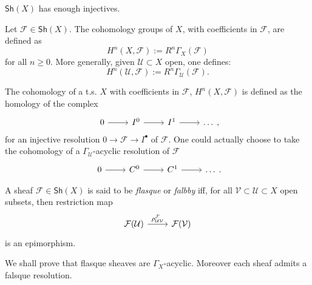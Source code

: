 \documentclass[../Main]{subfiles}
\begin{document}
\begin{prop}[]
	$\mathsf{Sh}\left(X\right)$ has enough injectives.
\end{prop}

\begin{defn}[Cohomology]
	Let $\mathcal{F} \in \mathsf{Sh}\left(X\right)$.
	The cohomology groups of $X$, with coefficients in $\mathcal{F}$,
	are defined as
	\begin{equation}
	H^{n} \left( X, \mathcal{F} \right) := R^{n} \Gamma_X \left( \mathcal{F} \right)
	\end{equation} 
	for all $n \geq 0$.
	More generally, given $\mathcal{U} \subset X$ open, one defines:
	\begin{equation}
	H^{n} \left( \mathcal{U}, \mathcal{F} \right) := R^{n} \Gamma_{\mathcal{U}} \left( \mathcal{F} \right)
	.\end{equation} 
\end{defn}

\begin{rem}[]
	The cohomology of a t.s. $X$ with coefficients in $\mathcal{F}$,
	$H^{n} \left( X, \mathcal{F} \right)$ is defined as the homology of the complex
	\begin{equation}
	\begin{tikzcd}
		0 \arrow[r, "", rightarrow] &
		I^0 \arrow[r, "", rightarrow] &
		I^1 \arrow[r, "", rightarrow] &
		\ldots
	\end{tikzcd}
	,\end{equation} 
	for an injective resolution $0 \to \mathcal{F} \to I^\bullet$ of $\mathcal{F}$.
	One could actually choose to take the cohomology of
	a $\Gamma_{\mathcal{U}}$-acyclic resolution of $\mathcal{F}$
	\begin{equation}
	\begin{tikzcd}
		0 \arrow[r, "", rightarrow] &
		C^0 \arrow[r, "", rightarrow] &
		C^1 \arrow[r, "", rightarrow] &
		\ldots
	\end{tikzcd}
	.\end{equation} 
\end{rem}

\begin{defn}
	A sheaf $\mathcal{F} \in \mathsf{Sh}\left(X\right)$ is said to 
	be {\em flasque} or {\em falbby} iff, for all $\mathcal{V} \subset \mathcal{U} \subset X$
	open subsets, then restriction map
	\begin{equation}
	\begin{tikzcd}
		\mathcal{F}(\mathcal{U}) \arrow[r, "\rho^{\mathcal{F}}_{\mathcal{UV}}", rightarrow] &
		\mathcal{F}(\mathcal{V})
	\end{tikzcd}
	\end{equation} 
	is an epimorphism.
\end{defn}
\begin{rem}[]
	We shall prove that flasque sheaves are $\Gamma_X$-acyclic.
	Moreover each sheaf admits a falsque resolution.
\end{rem}
\end{document}
